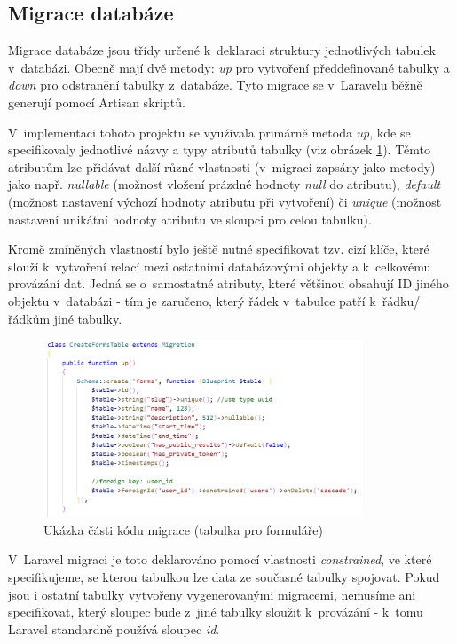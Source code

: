 	\subsection{Migrace databáze}
	Migrace databáze jsou třídy určené k~deklaraci struktury jednotlivých tabulek v~databázi. Obecně mají dvě metody: \textit{up} pro vytvoření předdefinované tabulky a \textit{down} pro odstranění tabulky z~databáze. Tyto migrace se v~Laravelu běžně generují pomocí Artisan skriptů.~\cite{LaravelMigrace}
	
	V~implementaci tohoto projektu se využívala primárně metoda \textit{up}, kde se specifikovaly jednotlivé názvy a typy atributů tabulky (viz obrázek \ref{fig:migrace}). Těmto atributům lze přidávat další různé vlastnosti (v~migraci zapsány jako metody) jako např. \textit{nullable} (možnost vložení prázdné hodnoty \textit{null} do atributu), \textit{default} (možnost nastavení výchozí hodnoty atributu při vytvoření) či \textit{unique} (možnost nastavení unikátní hodnoty atributu ve sloupci pro celou tabulku).
	
	Kromě zmíněných vlastností bylo ještě nutné specifikovat tzv. cizí klíče, které slouží k~vytvoření relací mezi ostatními databázovými objekty a k~celkovému provázání dat. Jedná se o~samostatné atributy, které většinou obsahují ID jiného objektu v~databázi - tím je zaručeno, který řádek v~tabulce patří k~řádku/řádkům jiné tabulky. 
	
	 \begin{figure}[h]
		\centering
		\includegraphics[width=0.85\textwidth]{img/migrace.png}
		\caption{Ukázka části kódu migrace (tabulka pro formuláře)}
		\label{fig:migrace}
	\end{figure}
	
	V~Laravel migraci je toto deklarováno pomocí vlastnosti \textit{constrained}, ve které specifikujeme, se kterou tabulkou lze data ze současné tabulky spojovat. Pokud jsou i ostatní tabulky vytvořeny vygenerovanými migracemi, nemusíme ani specifikovat, který sloupec bude z~jiné tabulky sloužit k~provázání - k~tomu Laravel standardně používá sloupec \textit{id}.
	
